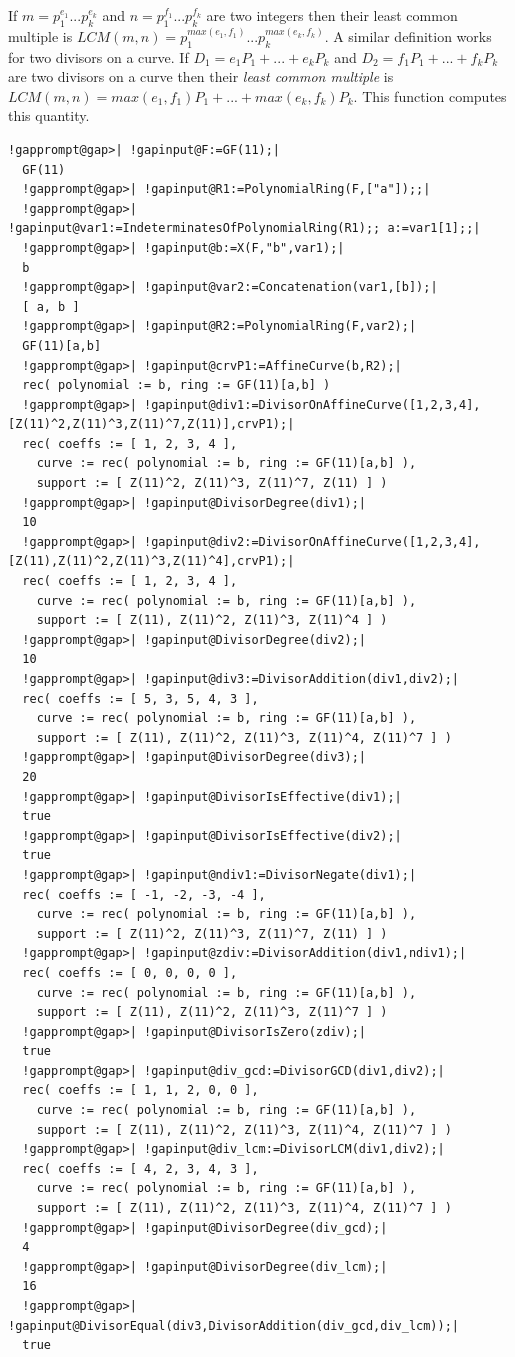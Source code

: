 \documentclass[a4paper,11pt]{report}
\begin{document}
{{{ If $m=p_1^{e_1}...p_k^{e_k}$ and $n=p_1^{f_1}...p_k^{f_k}$ are two integers then their least common multiple is $LCM(m,n)=p_1^{max(e_1,f_1)}...p_k^{max(e_k,f_k)}$. A similar definition works for two divisors on a curve. If $D_1=e_1P_1+...+e_kP_k$ and $D_2=f_1P_1+...+f_kP_k$ are two divisors on a curve then their \emph{least common multiple}  is $LCM(m,n)=max(e_1,f_1)P_1+...+max(e_k,f_k)P_k$. This function computes this quantity. 
\begin{Verbatim}[commandchars=!@|,fontsize=\small,frame=single,label=Example]
  !gapprompt@gap>| !gapinput@F:=GF(11);|
  GF(11)
  !gapprompt@gap>| !gapinput@R1:=PolynomialRing(F,["a"]);;|
  !gapprompt@gap>| !gapinput@var1:=IndeterminatesOfPolynomialRing(R1);; a:=var1[1];;|
  !gapprompt@gap>| !gapinput@b:=X(F,"b",var1);|
  b
  !gapprompt@gap>| !gapinput@var2:=Concatenation(var1,[b]);|
  [ a, b ]
  !gapprompt@gap>| !gapinput@R2:=PolynomialRing(F,var2);|
  GF(11)[a,b]
  !gapprompt@gap>| !gapinput@crvP1:=AffineCurve(b,R2);|
  rec( polynomial := b, ring := GF(11)[a,b] )
  !gapprompt@gap>| !gapinput@div1:=DivisorOnAffineCurve([1,2,3,4],[Z(11)^2,Z(11)^3,Z(11)^7,Z(11)],crvP1);|
  rec( coeffs := [ 1, 2, 3, 4 ], 
    curve := rec( polynomial := b, ring := GF(11)[a,b] ), 
    support := [ Z(11)^2, Z(11)^3, Z(11)^7, Z(11) ] )
  !gapprompt@gap>| !gapinput@DivisorDegree(div1);|
  10
  !gapprompt@gap>| !gapinput@div2:=DivisorOnAffineCurve([1,2,3,4],[Z(11),Z(11)^2,Z(11)^3,Z(11)^4],crvP1);|
  rec( coeffs := [ 1, 2, 3, 4 ], 
    curve := rec( polynomial := b, ring := GF(11)[a,b] ), 
    support := [ Z(11), Z(11)^2, Z(11)^3, Z(11)^4 ] )
  !gapprompt@gap>| !gapinput@DivisorDegree(div2);|
  10
  !gapprompt@gap>| !gapinput@div3:=DivisorAddition(div1,div2);|
  rec( coeffs := [ 5, 3, 5, 4, 3 ], 
    curve := rec( polynomial := b, ring := GF(11)[a,b] ), 
    support := [ Z(11), Z(11)^2, Z(11)^3, Z(11)^4, Z(11)^7 ] )
  !gapprompt@gap>| !gapinput@DivisorDegree(div3);|
  20
  !gapprompt@gap>| !gapinput@DivisorIsEffective(div1);|
  true
  !gapprompt@gap>| !gapinput@DivisorIsEffective(div2);|
  true
  !gapprompt@gap>| !gapinput@ndiv1:=DivisorNegate(div1);|
  rec( coeffs := [ -1, -2, -3, -4 ], 
    curve := rec( polynomial := b, ring := GF(11)[a,b] ), 
    support := [ Z(11)^2, Z(11)^3, Z(11)^7, Z(11) ] )
  !gapprompt@gap>| !gapinput@zdiv:=DivisorAddition(div1,ndiv1);|
  rec( coeffs := [ 0, 0, 0, 0 ], 
    curve := rec( polynomial := b, ring := GF(11)[a,b] ), 
    support := [ Z(11), Z(11)^2, Z(11)^3, Z(11)^7 ] )
  !gapprompt@gap>| !gapinput@DivisorIsZero(zdiv);|
  true
  !gapprompt@gap>| !gapinput@div_gcd:=DivisorGCD(div1,div2);|
  rec( coeffs := [ 1, 1, 2, 0, 0 ], 
    curve := rec( polynomial := b, ring := GF(11)[a,b] ), 
    support := [ Z(11), Z(11)^2, Z(11)^3, Z(11)^4, Z(11)^7 ] )
  !gapprompt@gap>| !gapinput@div_lcm:=DivisorLCM(div1,div2);|
  rec( coeffs := [ 4, 2, 3, 4, 3 ], 
    curve := rec( polynomial := b, ring := GF(11)[a,b] ), 
    support := [ Z(11), Z(11)^2, Z(11)^3, Z(11)^4, Z(11)^7 ] )
  !gapprompt@gap>| !gapinput@DivisorDegree(div_gcd);|
  4
  !gapprompt@gap>| !gapinput@DivisorDegree(div_lcm);|
  16
  !gapprompt@gap>| !gapinput@DivisorEqual(div3,DivisorAddition(div_gcd,div_lcm));|
  true
\end{Verbatim}
  }

}}
\end{document}
